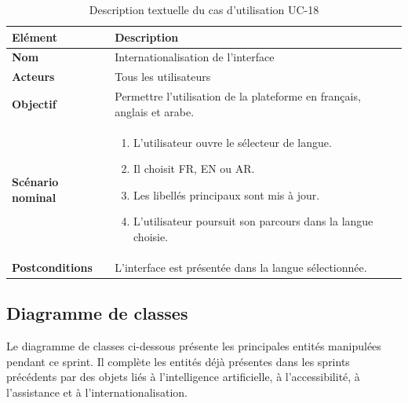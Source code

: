 \documentclass[12pt,a4paper]{report}
\newcommand{\tblhead}[1]{\cellcolor{darkblue}\color{white}\bfseries #1}
\newcommand{\tblleft}[1]{\bfseries\color{darkblue} #1}
\begin{document}
\renewcommand{\arraystretch}{1.25}
\begin{table}[H]
\centering
\begin{tabularx}{\textwidth}{|L{3.2cm}|Y|}
\hline
\tblhead{Elément} & \tblhead{Description} \\
\hline
\tblleft{Nom} & Internationalisation de l'interface \\
\hline
\tblleft{Acteurs} & Tous les utilisateurs \\
\hline
\tblleft{Objectif} & Permettre l'utilisation de la plateforme en français, anglais et arabe. \\
\hline
\tblleft{Scénario nominal} &
\begin{enumerate}
  \item L'utilisateur ouvre le sélecteur de langue.
  \item Il choisit FR, EN ou AR.
  \item Les libellés principaux sont mis à jour.
  \item L'utilisateur poursuit son parcours dans la langue choisie.
\end{enumerate} \\
\hline
\tblleft{Postconditions} & L'interface est présentée dans la langue sélectionnée. \\
\hline
\end{tabularx}
\caption{Description textuelle du cas d'utilisation UC-18}
\label{tab:uc18-i18n}
\end{table}
\renewcommand{\arraystretch}{1}

\subsection{Diagramme de classes}

Le diagramme de classes ci-dessous présente les principales entités manipulées pendant ce sprint. Il complète les entités déjà présentes dans les sprints précédents par des objets liés à l'intelligence artificielle, à l'accessibilité, à l'assistance et à l'internationalisation.
\end{document}
